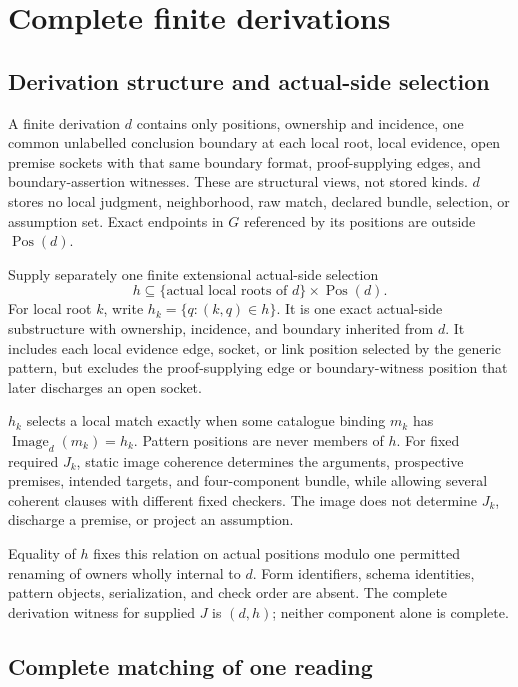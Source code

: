\documentclass[11pt,twoside]{article}
\begin{document}
\section{Complete finite derivations}\label{sec:derivations}

\subsection{Derivation structure and actual-side selection}

A finite derivation \(d\) contains only positions, ownership and incidence, one
common unlabelled conclusion boundary at each local root, local evidence, open
premise sockets with that same boundary format, proof-supplying edges, and
boundary-assertion witnesses.  These are structural views, not stored kinds.
\(d\) stores no local judgment, neighborhood, raw match, declared bundle,
selection, or assumption set.  Exact endpoints in \(G\) referenced by its positions
are outside \(\operatorname{Pos}(d)\).

Supply separately one finite extensional actual-side selection
\[
  h\subseteq
  \{\text{actual local roots of }d\}\times\operatorname{Pos}(d).
\]
For local root \(k\), write \(h_k=\{q:(k,q)\in h\}\).  It is one exact
actual-side substructure with ownership, incidence, and boundary inherited from
\(d\).  It includes each local evidence edge, socket, or link position selected by
the generic pattern, but excludes the proof-supplying edge or boundary-witness
position that later discharges an open socket.

\(h_k\) selects a local match exactly when some catalogue binding \(m_k\) has
\(\operatorname{Image}_d(m_k)=h_k\).  Pattern positions are never members of
\(h\).  For fixed required \(J_k\), static image coherence determines the
arguments, prospective premises, intended targets, and four-component bundle,
while allowing several coherent clauses with different fixed checkers.  The image
does not determine \(J_k\), discharge a premise, or project an assumption.

Equality of \(h\) fixes this relation on actual positions modulo one permitted
renaming of owners wholly internal to \(d\).  Form identifiers, schema identities,
pattern objects, serialization, and check order are absent.  The complete
derivation witness for supplied \(J\) is \((d,h)\); neither component alone is
complete.

\subsection{Complete matching of one reading}
\end{document}
